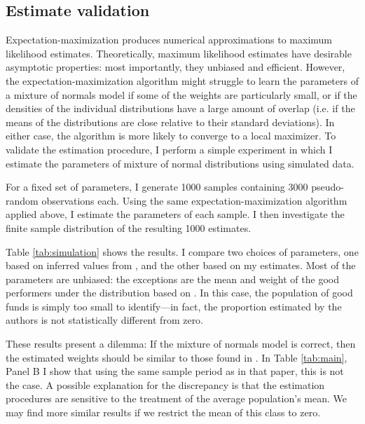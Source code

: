 \subsection{Estimate validation}
\label{sec:simulation}
Expectation-maximization produces numerical approximations to maximum likelihood estimates. Theoretically, maximum likelihood estimates have desirable asymptotic properties: most importantly, they unbiased and efficient.  However, the expectation-maximization algorithm might struggle to learn the parameters of a mixture of normals model if some of the weights are particularly small, or if the densities of the individual distributions have a large amount of overlap (i.e. if the means of the distributions are close relative to their standard deviations). In either case, the algorithm is more likely to converge to a local maximizer. To validate the estimation procedure, I perform a simple experiment in which I estimate the parameters of mixture of normal distributions using simulated data.

For a fixed set of parameters, I generate 1000 samples containing 3000 pseudo-random observations each. Using the same expectation-maximization algorithm applied above, I estimate the parameters of each sample. I then investigate the finite sample distribution of the resulting 1000 estimates.

Table \ref{tab:simulation} shows the results. I compare two choices of parameters, one based on inferred values from \citet{Barras2010}, and the other based on my estimates. Most of the parameters are unbiased: the exceptions are the mean and weight of the good performers under the distribution based on \citet{Barras2010}.  In this case, the population of good funds is simply too small to identify---in fact, the proportion estimated by the authors is not statistically different from zero.

These results present a dilemma: If the mixture of normals model is correct, then the estimated weights should be similar to those found in \citet{Barras2010}. In Table \ref{tab:main}, Panel B I show that using the same sample period as in that paper, this is not the case.  A possible explanation for the discrepancy is that the estimation procedures are sensitive to the treatment of the average population's mean.  We may find more similar results if we restrict the mean of this class to zero.

